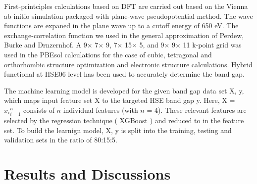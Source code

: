 \documentclass[%
reprint,
superscriptaddress,
citeautoscript,
 amsmath,amssymb,
 aps,
 prl,
floatfix,
]{revtex4-1}
\begin{document}
First-printciples calculations based on DFT are carried out based on the Vienna ab initio simulation packaged with plane-wave pseudopotential method\cite{}. The wave functions are expaned in the plane wave up to a cutoff energy of 650 eV. The exchange-correlation function we used in the general approximation of Perdew, Burke and Drnzernhof. A 9$\times$ 7$\times$ 9, 7$\times$ 15$\times$ 5, and 9$\times$ 9$\times$ 11 k-point grid was used in the PBEsol calculations for the case of cubic, tetragonal and orthorhombic structure optimization and electronic structure calculations. Hybrid functional at HSE06 level has been used
to accurately determine the band gap. 
 
The machine learning model is developed for the given band gap data set {X, y}, which maps input feature set X to the targeted HSE band gap y. Here, X = ${x_{i}}_{i = 1} ^{n}$ consists of $n$ individual features (with $n$ = 4). These relevant features are selected by the regression technique ( XGBoost ) and reduced to in the feature set. To build the learnign model, {X, y} is split into the training, testing and validation sets in the ratio of 80:15:5. 

\section{Results and Discussions}



\end{document}
